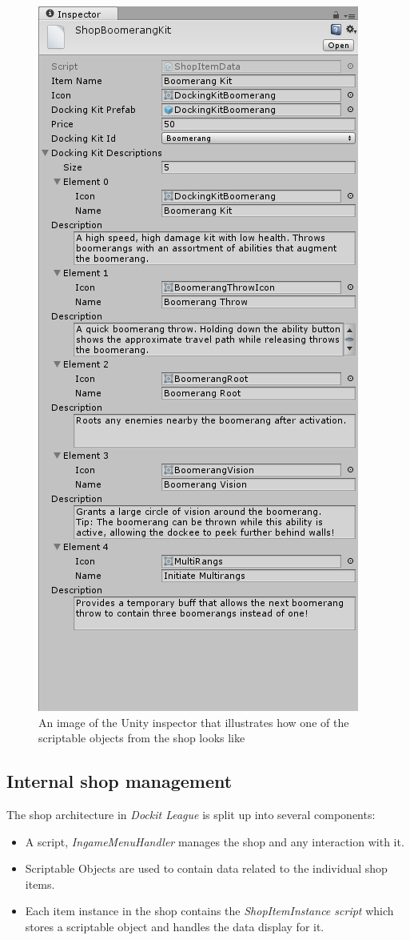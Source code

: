 \begin{figure}[tbph]
  \centering
  \includegraphics[width=.6\textwidth]{images/scriptableObjectInspector}
  \caption[Image of the Unity inspector showing scriptable objects from the shop]{An image of the Unity inspector that illustrates how one of the scriptable objects from the shop looks like}
  \label{fig:scriptableObjectInspectorShop}
\end{figure}

\subsection{Internal shop management}
The shop architecture in \emph{Dockit League} is split up into several components:
\begin{itemize}
    \item A script, \emph{IngameMenuHandler} manages the shop and any interaction with it.
    \item Scriptable Objects are used to contain data related to the individual shop items. 
    \item Each item instance in the shop contains the \emph{ShopItemInstance script} which stores a scriptable object and handles the data display for it. 
\end{itemize}

